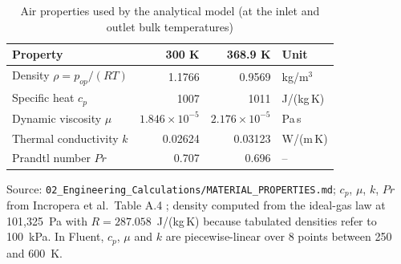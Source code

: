 \begin{table}[htbp]
\centering
\small
\caption{Air properties used by the analytical model (at the inlet and outlet bulk temperatures)}
\label{tab:air}
\begin{tabular}{lrrl}
\toprule
Property & 300 K & 368.9 K & Unit \\
\midrule
Density $\rho = p_{op}/(RT)$ & 1.1766 & 0.9569 & kg/m$^3$ \\
Specific heat $c_p$ & 1007 & 1011 & J/(kg\,K) \\
Dynamic viscosity $\mu$ & $1.846\times10^{-5}$ & $2.176\times10^{-5}$ & Pa\,s \\
Thermal conductivity $k$ & 0.02624 & 0.03123 & W/(m\,K) \\
Prandtl number $Pr$ & 0.707 & 0.696 & -- \\
\bottomrule
\end{tabular}
\par\smallskip\parbox{\linewidth}{\footnotesize\raggedright Source: \texttt{02\_Engineering\_Calculations/MATERIAL\_PROPERTIES.md}; $c_p$, $\mu$, $k$, $Pr$ from Incropera et al.\ Table A.4 \cite{incropera}; density computed from the ideal-gas law at 101,325~Pa with $R = 287.058$~J/(kg\,K) because tabulated densities refer to 100~kPa. In Fluent, $c_p$, $\mu$ and $k$ are piecewise-linear over 8 points between 250 and 600~K.}
\end{table}
